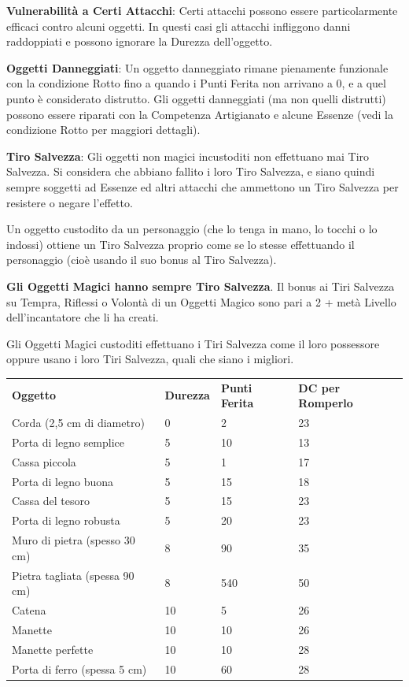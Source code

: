 \documentclass[a4paper,11pt,twoside,openany]{book}
\begin{document}
{\textbf{Vulnerabilità a Certi Attacchi}: Certi attacchi possono essere particolarmente efficaci contro alcuni oggetti. In questi casi gli attacchi infliggono danni raddoppiati e possono ignorare la Durezza dell'oggetto.

\textbf{Oggetti Danneggiati}: Un oggetto danneggiato rimane pienamente funzionale con la condizione Rotto fino a quando i Punti Ferita non arrivano a 0, e a quel punto è considerato distrutto. Gli oggetti danneggiati (ma non quelli distrutti) possono essere riparati con la Competenza Artigianato e alcune Essenze (vedi la condizione Rotto per maggiori dettagli).

\textbf{Tiro Salvezza}: Gli oggetti non magici incustoditi non effettuano mai Tiro Salvezza. Si considera che abbiano fallito i loro Tiro Salvezza, e siano quindi sempre soggetti ad Essenze ed altri attacchi che ammettono un Tiro Salvezza per resistere o negare l'effetto.

Un oggetto custodito da un personaggio (che lo tenga in mano, lo tocchi o lo indossi) ottiene un Tiro Salvezza proprio come se lo stesse effettuando il personaggio (cioè usando il suo bonus al Tiro Salvezza).

\textbf{Gli Oggetti Magici hanno sempre Tiro Salvezza}. Il bonus ai Tiri Salvezza su Tempra, Riflessi o Volontà di un Oggetti Magico sono pari a 2 + metà Livello dell'incantatore che li ha creati.

Gli Oggetti Magici custoditi effettuano i Tiri Salvezza come il loro possessore oppure usano i loro Tiri Salvezza, quali che siano i migliori.

\bigskip

\begin{tabular}{L{6cm} L{3cm} L{3cm} L{3cm}}
\toprule
\textbf{Oggetto} & \textbf{Durezza} & \textbf{Punti Ferita} & \textbf{DC per Romperlo}\tabularnewline
Corda (2,5 cm di diametro) & 0 & 2 & 23\tabularnewline
Porta di legno semplice & 5 & 10 & 13\tabularnewline
Cassa piccola & 5 & 1 & 17\tabularnewline
Porta di legno buona & 5 & 15 & 18\tabularnewline
Cassa del tesoro & 5 & 15 & 23\tabularnewline
Porta di legno robusta & 5 & 20 & 23\tabularnewline
Muro di pietra (spesso 30 cm) & 8 & 90 & 35\tabularnewline
Pietra tagliata (spessa 90 cm) & 8 & 540 & 50\tabularnewline
Catena & 10 & 5 & 26\tabularnewline
Manette & 10 & 10 & 26\tabularnewline
Manette perfette & 10 & 10 & 28\tabularnewline
Porta di ferro (spessa 5 cm) & 10 & 60 & 28\tabularnewline
\end{tabular}

\bigskip

}
\end{document}
